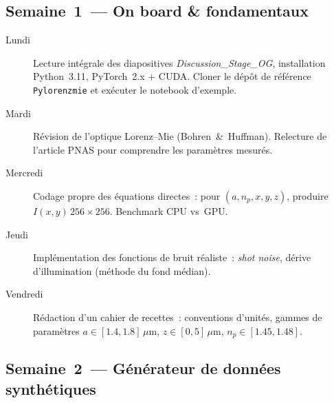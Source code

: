 \documentclass[11pt,a4paper]{article}
\begin{document}
\subsection*{Semaine 1 — On board \& fondamentaux}
\begin{description}
  \item[Lundi] Lecture intégrale des diapositives \emph{Discussion\_Stage\_OG}, installation Python 3.11, PyTorch 2.x + CUDA. Cloner le dépôt de référence \texttt{Pylorenzmie} et exécuter le notebook d'exemple.
  \item[Mardi] Révision de l'optique Lorenz--Mie (Bohren \& Huffman). Relecture de l'article PNAS pour comprendre les paramètres mesurés.
  \item[Mercredi] Codage propre des équations directes : pour \((a, n_p, x, y, z)\), produire \(I(x,y)\,256\times256\). Benchmark CPU vs GPU.
  \item[Jeudi] Implémentation des fonctions de bruit réaliste : \emph{shot noise}, dérive d'illumination (méthode du fond médian).
  \item[Vendredi] Rédaction d'un cahier de recettes : conventions d'unités, gammes de paramètres \(a\in[1.4,1.8]\,\mu\text{m}\), \(z\in[0,5]\,\mu\text{m}\), \(n_p\in[1.45,1.48]\).
\end{description}

\subsection*{Semaine 2 — Générateur de données synthétiques}
\end{document}
